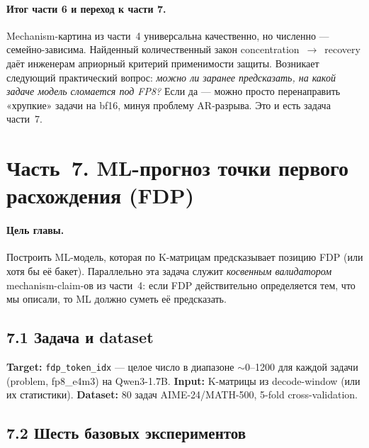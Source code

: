 \documentclass[a4paper,12pt]{article}
\begin{document}
\paragraph{Итог части 6 и переход к части 7.} Mechanism-картина из
части~4 универсальна качественно, но численно --- семейно-зависима.
Найденный количественный закон concentration~$\to$~recovery даёт
инженерам априорный критерий применимости защиты. Возникает следующий
практический вопрос: \textit{можно ли заранее предсказать, на какой
задаче модель сломается под FP8?} Если да --- можно просто
перенаправить «хрупкие» задачи на bf16, минуя проблему AR-разрыва. Это
и есть задача части~7.

\clearpage

\section*{Часть~7. ML-прогноз точки первого расхождения (FDP)}

\paragraph{Цель главы.} Построить ML-модель, которая по K-матрицам
предсказывает позицию FDP (или хотя бы её бакет). Параллельно эта задача
служит \textit{косвенным валидатором} mechanism-claim-ов из части~4:
если FDP действительно определяется тем, что мы описали, то ML должно
суметь её предсказать.

\subsection*{7.1 Задача и dataset}

\textbf{Target:} \texttt{fdp\_token\_idx} --- целое число в диапазоне
$\sim 0$--1200 для каждой задачи (problem, fp8\_e4m3) на Qwen3-1.7B.
\textbf{Input:} K-матрицы из decode-window (или их статистики).
\textbf{Dataset:} 80 задач AIME-24/MATH-500, 5-fold cross-validation.

\subsection*{7.2 Шесть базовых экспериментов}
\end{document}
